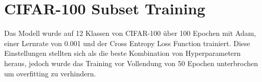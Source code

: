 \section{CIFAR-100 Subset Training}\label{section:cifar-experimente}
Das Modell wurde auf 12 Klassen von CIFAR-100 über 100 Epochen mit Adam, einer Lernrate von 0.001 und der Cross Entropy Loss Function
trainiert. Diese Einstellungen stellten sich als die beste Kombination von Hyperparametern heraus, jedoch wurde das Training vor Vollendung 
von 50 Epochen unterbrochen um \gls{overfitting} zu verhindern.

